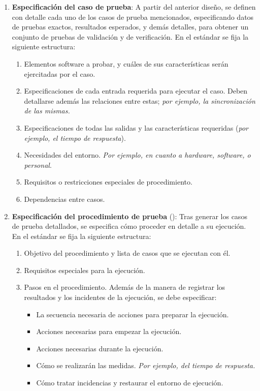 \begin{enumerate}
    \item \textbf{Especificación del caso de prueba}: A partir del anterior diseño, se definen con detalle cada uno de los casos de prueba mencionados, especificando datos de pruebas exactos, resultados esperados, y demás detalles, para obtener un conjunto de pruebas de validación y de verificación. En el estándar se fija la siguiente estructura:
    \begin{enumerate}
        \item Elementos software a probar, y cuáles de sus características serán ejercitadas por el caso.
        \item Especificaciones de cada entrada requerida para ejecutar el caso. Deben detallarse además las relaciones entre estas; \textit{por ejemplo, la sincronización de las mismas.}
        \item Especificaciones de todas las salidas y las características requeridas (\textit{por ejemplo, el tiempo de respuesta}).
        \item Necesidades del entorno. \textit{Por ejemplo, en cuanto a hardware, software, o personal}.
        \item Requisitos o restricciones especiales de procedimiento.
        \item Dependencias entre casos.
    \end{enumerate}

    \item \textbf{Especificación del procedimiento de prueba} (\textit{}): Tras generar los casos de prueba detallados, se especifica cómo proceder en detalle a su ejecución. En el estándar se fija la siguiente estructura:
    \begin{enumerate}
        \item Objetivo del procedimiento y lista de casos que se ejecutan con él.
        \item Requisitos especiales para la ejecución.
        \item Pasos en el procedimiento. Además de la manera de registrar los resultados y los incidentes de la ejecución, se debe especificar:
        \begin{itemize}
            \item La secuencia necesaria de acciones para preparar la ejecución.
            \item Acciones necesarias para empezar la ejecución.
            \item Acciones necesarias durante la ejecución.
            \item Cómo se realizarán las medidas. \textit{Por ejemplo, del tiempo de respuesta.}
            \item Cómo tratar incidencias y restaurar el entorno de ejecución.
        \end{itemize}
    \end{enumerate}
\end{enumerate}


